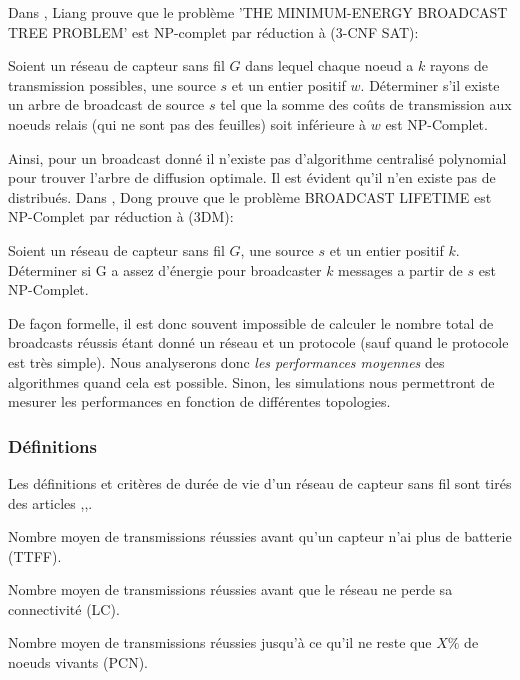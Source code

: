 Dans \cite{Liang2002}, Liang prouve que le  problème 'THE MINIMUM-ENERGY BROADCAST
TREE PROBLEM' est NP-complet par réduction à (3-CNF SAT):
\begin{myth}
Soient un réseau de capteur sans fil $G$ dans lequel chaque noeud a $k$ rayons de transmission possibles, une source $s$ et un entier positif $w$.
Déterminer s'il existe un arbre de broadcast de source $s$ tel que la somme des coûts de transmission aux noeuds relais (qui ne sont pas des feuilles) soit inférieure à $w$ est NP-Complet.
\end{myth}
Ainsi, pour un broadcast donné il n'existe pas d'algorithme centralisé polynomial pour trouver l'arbre de diffusion optimale. Il est évident qu'il n'en existe pas de distribués. 
Dans \cite{Dong2005}, Dong prouve que le  problème BROADCAST LIFETIME est NP-Complet par réduction à (3DM):
\begin{myth}
Soient un réseau de capteur sans fil $G$, une source $s$ et un entier positif $k$.
Déterminer si G a assez d'énergie pour broadcaster $k$ messages a partir de $s$ est NP-Complet.
\end{myth}

De façon formelle, il est donc souvent impossible de calculer le nombre total de broadcasts réussis étant donné un réseau et un protocole (sauf quand le protocole est très simple). Nous analyserons donc \textit{les performances moyennes} des algorithmes quand cela est possible. Sinon, les simulations nous permettront de mesurer les performances en fonction de différentes topologies.

\subsubsection{Définitions}
Les définitions et critères de durée de vie d'un réseau de capteur sans fil sont tirés des articles \cite{Dietrich2009},\cite{Champ2009lifetime},\cite{Elleithy2011}. 

\begin{mylt}\label{TTFF}
Nombre moyen de transmissions réussies avant qu'un capteur n'ai plus de batterie (TTFF).
\end{mylt}
\begin{mylt}\label{LC}
Nombre moyen de transmissions réussies avant que le réseau ne perde sa connectivité (LC).
\end{mylt}
\begin{mylt}\label{PCN}
Nombre moyen de transmissions réussies jusqu'à ce qu'il ne reste que $X\%$ de noeuds vivants (PCN).
\end{mylt}


